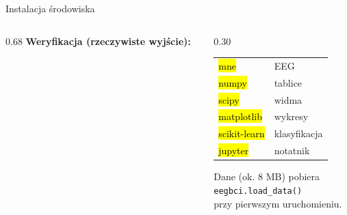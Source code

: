 \begin{frame}{Instalacja środowiska}
\begin{columns}[T,onlytextwidth]
\begin{column}{0.68\textwidth}
\vspace{6pt}
{\color{plum}\bfseries Weryfikacja (rzeczywiste wyjście):}\par\vspace{2pt}
\end{column}
\begin{column}{0.30\textwidth}
\fontsize{11}{13}\selectfont
\begin{tabular}{@{}ll@{}}
\hl{mne} & EEG\\
\hl{numpy} & tablice\\
\hl{scipy} & widma\\
\hl{matplotlib} & wykresy\\
\hl{scikit-learn} & klasyfikacja\\
\hl{jupyter} & notatnik
\end{tabular}
\vspace{6pt}

{\color{grey}Dane (ok. 8 MB) pobiera\\ \texttt{eegbci.load\_data()} \\przy pierwszym uruchomieniu.}
\end{column}
\end{columns}
\end{frame}
